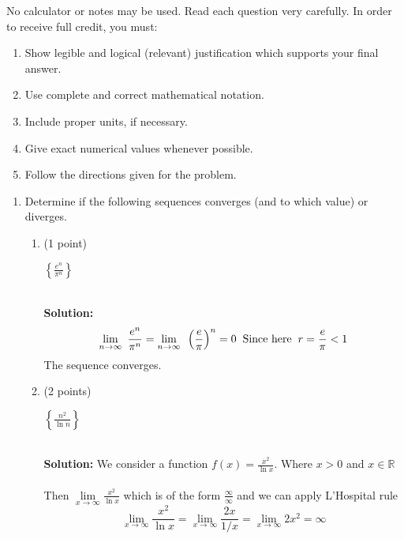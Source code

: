 \documentclass[paper=a4, fontsize=11pt]{scrartcl} %
\numberwithin{equation}{section} %
\numberwithin{figure}{section} %
\numberwithin{table}{section} %
\begin{document}
No calculator or notes may be used.  Read each question very carefully.  In order to receive full credit, you must:
\begin{enumerate}
\item Show legible and logical (relevant) justification which supports your final answer.
\item Use complete and correct mathematical notation.
\item Include proper units, if necessary.
\item Give exact numerical values whenever possible.
\item Follow the directions given for the problem.
\end{enumerate}
\newpage
\begin{enumerate}
\item Determine if the following sequences converges (and to which value) or diverges. 
\begin{enumerate}
\item (1 point)\hspace{4mm}\begin{large}$\left\{\frac{e^n}{\pi^n}\right\}$\end{large}\\
\textbf{Solution:}
\begin{eqnarray*}
\lim\limits_{n\rightarrow\infty}\text{  }\frac{e^n}{\pi^n}=\lim\limits_{n\rightarrow\infty}\text{  }\left(\frac{e}{\pi}\right)^n=0\hspace{2mm}\text{Since here}\hspace{2mm} r=\frac{e}{\pi}<1
\end{eqnarray*}
The sequence converges.
\item (2 points)\hspace{4mm} \begin{large}$\left\{\frac{n^2}{\ln n}\right\}$\end{large}\\
\textbf{Solution:}\text{   } We consider a function $f(x)=\frac{x^2}{\ln x}$. Where $x>0$ and $x\in \mathbb{R}$\\\\ Then\hspace{3mm} $\lim\limits_{x\rightarrow\infty}\frac{x^2}{\ln x}$\hspace{3mm} which is of the form\hspace{3mm} $\frac{\infty}{\infty}$ \hspace{3mm} and we can apply L'Hospital rule
$$\lim\limits_{x\rightarrow\infty}\frac{x^2}{\ln x}=\lim\limits_{x\rightarrow\infty}\frac{2x}{1/x}=\lim\limits_{x\rightarrow\infty}2x^2=\infty$$

\end{enumerate}
\end{enumerate}
\end{document}
